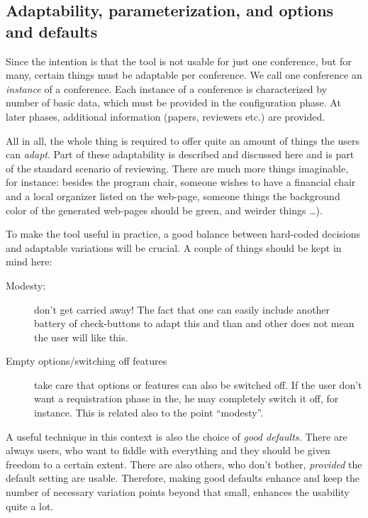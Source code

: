 \subsection{Adaptability, parameterization, and options and defaults}
\label{sec:adaptability}%

Since the intention is that the tool is not usable for just one conference,
but for many, certain things must be adaptable per conference. We call one
conference an \emph{instance} of a conference.  Each instance of a
conference is characterized by number of basic data, which must be provided
in the configuration phase. At later phases, additional information
(papers, reviewers etc.) are provided.

All in all, the whole thing is required to offer quite an amount of things
the users can \emph{adapt}. Part of these adaptability is described and
discussed here and is part of the standard scenario of reviewing. There are
much more things imaginable, for instance: besides the program chair,
someone wishes to have a financial chair and a local organizer listed on
the web-page, someone things the background color of the generated
web-pages should be green, and weirder things \ldots).

To make the tool useful in practice, a good balance between hard-coded
decisions and adaptable variations will be crucial. A couple of things
should be kept in mind here:
\begin{description}
\item[Modesty:] don't get carried away! The fact that one can easily
  include another battery of check-buttons to adapt this and than and other
  does not mean the user will like this. 
\item[Empty options/switching off features] take care that options or
  features can also be switched off. If the user don't want a requistration
  phase in the, he may completely switch it off, for instance. This is
  related also to the point ``modesty''.
\end{description}

A useful technique in this context is also the choice of \emph{good
  defaults.} There are always users, who want to fiddle with everything and
they should be given freedom to a certain extent. There are also others,
who don't bother, \emph{provided} the default setting are usable.
Therefore, making good defaults enhance and keep the number of necessary
variation points beyond that small, enhances the usability quite a lot.








